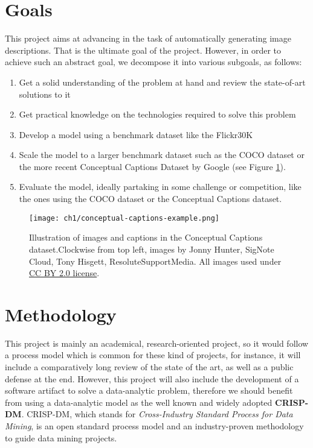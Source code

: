 \section{Goals}

This project aims at advancing in the task of automatically generating image descriptions. That is the ultimate goal of the project. However, in order to achieve such an abstract goal, we decompose it into various subgoals, as follows:

\begin{enumerate}
\item Get a solid understanding of the problem at hand and review the state-of-art solutions to it
\item Get practical knowledge on the technologies required to solve this problem
\item Develop a model using a benchmark dataset like the Flickr30K
\item Scale the model to a larger benchmark dataset such as the COCO\cite{Lin2014} dataset or the more recent Conceptual Captions Dataset by Google \cite{Sharma2018}  (see Figure \ref{fig:conceptual-captions}).
\item Evaluate the model, ideally partaking in some challenge or competition, like the ones using the COCO dataset or the Conceptual Captions dataset.
\end{enumerate}

\begin{figure}[h]
	\centering
	\texttt{[image: ch1/conceptual-captions-example.png]}
	\caption{Illustration of images and captions in the Conceptual Captions dataset.Clockwise from top left, images by Jonny Hunter, SigNote Cloud, Tony Hisgett, ResoluteSupportMedia. All images used under \href{https://creativecommons.org/licenses/by/2.0/}{CC BY 2.0 license}.}
	\label{fig:conceptual-captions}
\end{figure}

\section{Methodology}

This project is mainly an academical, research-oriented project, so it would follow a process model which is common for these kind of projects, for instance, it will include a comparatively long review of the state of the art, as well as a public defense at the end. However, this project will also include the development of a software artifact to solve a data-analytic problem, therefore we should benefit from using a data-analytic model as the well known and widely adopted \textbf{CRISP-DM}. CRISP-DM, which stands for \textit{Cross-Industry Standard Process for Data Mining}, is an open standard process model and an industry-proven methodology to guide data mining projects.

